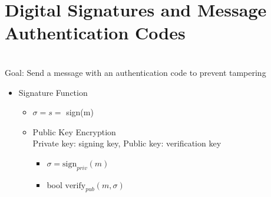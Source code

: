 \section{Digital Signatures and Message Authentication Codes}
\\Goal: Send a message with an authentication code to prevent tampering
\begin{itemize}
\item Signature Function
    \begin{itemize}
    \item $\sigma = s =$ sign(m)
    \item Public Key Encryption
    \\ Private key: signing key, Public key: verification key
        \begin{itemize}
        \item $\sigma = \text{sign}_{priv}(m)$
        \item bool $\text{verify}_{pub}(m, \sigma)$
        \end{itemize}
    \end{itemize}
\end{itemize}